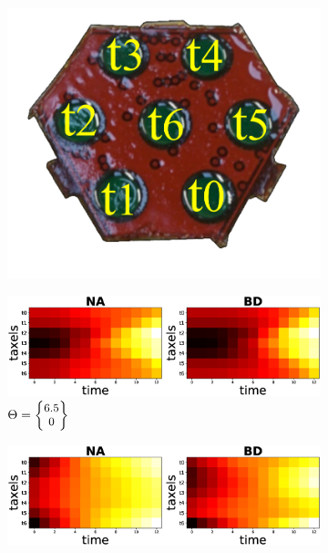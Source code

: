 \begin{figure}[]
	\centering
	\begin{subfigure}[b]{.12\textwidth}
		\includegraphics[width=\textwidth]{./figs/skin.pdf}
		\vspace{1pt}
		\caption{}
		\vspace{6pt}
		\label{rawnabs:skin}
	\end{subfigure}
	\hspace{0.005\textwidth}
	\begin{subfigure}[b]{.38\textwidth}
		\includegraphics[width=\textwidth]{./figs/phantom1properties_rawdataf_Vertical-d6_5.eps}
		\caption{$\Theta = \small{\begin{Bmatrix}6.5\\ 0\end{Bmatrix}}$}
		\label{rawnabs:d6_5}
	\end{subfigure}
	\hspace{0.005\textwidth}
	\begin{subfigure}[b]{.38\textwidth}
		\includegraphics[width=\textwidth]{./figs/phantom1properties_rawdataf_Vertical-d19_5.eps}

\end{subfigure}
\end{figure}
